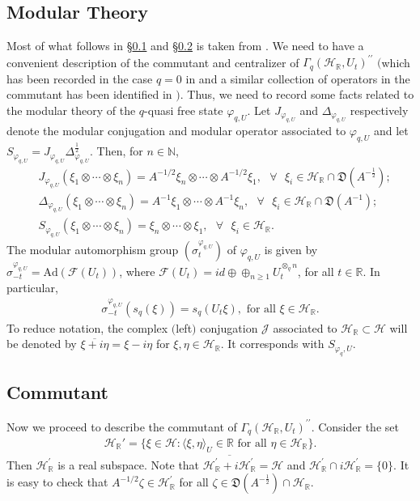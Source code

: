 \documentclass[12pt, a4paper,reqno]{amsart}
\theoremstyle{definition}
\renewcommand{\geq}{\geqslant}
\def\N{\mathbb N}
\def\R{\mathbb R}
\newcommand{\CF}{\mathcal{F}}
\newcommand{\CH}{\mathcal{H}}
\newcommand{\half}{{\frac{1}{2}}}
\begin{document}
\subsection{Modular Theory}\label{modular}
Most of what follows in \S\ref{modular} and \S\ref{Commute} is taken from \cite{Shlyakhtenko,Hiai}. We need to have a convenient description of the commutant and centralizer of $\Gamma_q( \CH_\R, U_t)^{\prime\prime}$ $($which has been recorded in the case $q=0$ in \cite{Shlyakhtenko} and a similar collection of operators in the commutant has been identified in \cite{Hiai}$)$. Thus, we need to record some facts related to the modular theory of the $q$-quasi free state $\varphi_{q,U}$.  Let $J_{\varphi_{q,U}}$ and $\Delta_{\varphi_{q,U}}$ respectively denote the modular conjugation and modular operator associated to $\varphi_{q,U}$ and let $S_{\varphi_{q,U}}=J_{\varphi_{q,U}}\Delta_{\varphi_{q,U}}^{\frac{1}{2}}$. Then, for $n\in\N$, 
\begin{align}\label{modulartheory}
&J_{\varphi_{q,U}}(\xi_1 \otimes \cdots \otimes \xi_n) = A^{-1/2}\xi_n \otimes \cdots \otimes A^{-1/2}\xi_1, \text{ }\forall\text{ } \xi_{i}\in \mathcal{H}_{\mathbb{R}}\cap \mathfrak{D}(A^{-\half});\\
\nonumber&\Delta_{\varphi_{q,U}}(\xi_1 \otimes\cdots \otimes \xi_n ) =
A^{-1}\xi_1 \otimes \cdots\otimes A^{-1}\xi_n, \text{ }\forall\text{ } \xi_{i}\in \mathcal{H}_{\mathbb{R}}\cap \mathfrak{D}(A^{-1});\\
	\nonumber&S_{\varphi_{q,U}}(\xi_1 \otimes \cdots \otimes \xi_n) =\xi_n \otimes \cdots \otimes \xi_1, \text{ }\forall\text{ } \xi_{i}\in \mathcal{H}_{\mathbb{R}}.
\end{align}
The modular automorphism group $(\sigma_{t}^{\varphi_{q,U}})$ of $\varphi_{q,U}$ is given by $\sigma_{-t}^{\varphi_{q,U}}=\text{Ad}(\CF(U_{t}))$, where $\CF(U_{t})=id\oplus \oplus_{n\geq 1} U_{t}^{\otimes_q n}$, for all $t\in \mathbb{R}$. In particular,
\begin{align}\label{modularaut}
\sigma^{\varphi_{q,U}}_{-t}(s_q(\xi)) = s_q(U_{t}\xi), \text{ for all } \xi \in \mathcal{H}_{\mathbb{R}}. 
\end{align}
To reduce notation, the complex $($left$)$ conjugation $\mathcal{J}$ associated to $\CH_\R\subset \CH$ will be denoted 
by $\overline{\xi+ i \eta}= \xi-i \eta$ for $\xi,\eta\in\CH_\R$. It corresponds with $S_{\varphi_q,U}$.

\subsection{Commutant}\label{Commute} Now we proceed to describe the commutant of $\Gamma_q( \CH_\R, U_t)^{\prime\prime}$. Consider the  set
\begin{align*}
\CH_\R' = \{ \xi \in \CH : \langle \xi, \eta \rangle_U \in \R \text{ for all }  \eta \in \CH_\R \}. 
\end{align*}
Then $\CH_\R^\prime$ is a real  subspace. Note that $\overline{ \CH_\R^\prime + i\CH_\R^\prime } = \CH$ and $ \CH_\R^\prime \cap i \CH^{\prime}_\R = \{ 0\}$. It is easy to check that $A^{-1/2} \zeta \in \CH_\R^\prime$  for all $\zeta \in \mathfrak{D}(A^{-\half})\cap \CH_\R$.
\end{document}
